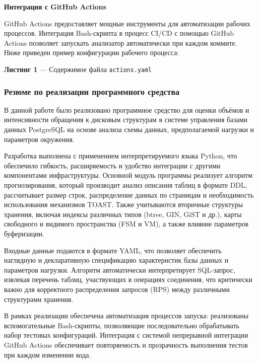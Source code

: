 \textbf{Интеграция с GitHub Actions}

GitHub Actions предоставляет мощные инструменты для автоматизации рабочих процессов. Интеграция Bash-скрипта в процесс CI/CD с помощью GitHub Actions позволяет запускать анализатор автоматически при каждом коммите. Ниже приведен пример конфигурации рабочего процесса:

\begin{center}
\textbf{Листинг 1} --- Содержимое файла \texttt{actions.yaml}
\end{center}




\subsubsection{Резюме по реализации программного средства}

В данной работе было реализовано программное средство для оценки объёмов и интенсивности обращения к дисковым структурам в системе управления базами данных PostgreSQL на основе анализа схемы данных, предполагаемой нагрузки и параметров окружения.

Разработка выполнена с применением интерпретируемого языка Python, что обеспечило гибкость, расширяемость и удобство интеграции с другими компонентами инфраструктуры. Основной модуль программы реализует алгоритм прогнозирования, который производит анализ описания таблиц в формате DDL, рассчитывает размер строк, распределение данных по страницам и необходимость использования механизмов TOAST. Также учитываются вторичные структуры хранения, включая индексы различных типов (btree, GIN, GiST и др.), карты свободного и видимого пространства (FSM и VM), а также влияние параметров буферизации.

Входные данные подаются в формате YAML, что позволяет обеспечить наглядную и декларативную спецификацию характеристик базы данных и параметров нагрузки. Алгоритм автоматически интерпретирует SQL-запрос, извлекая перечень таблиц, участвующих в операциях соединения, что критически важно для корректного распределения запросов (RPS) между различными структурами хранения.

В рамках реализации обеспечена автоматизация процессов запуска: реализованы вспомогательные Bash-скрипты, позволяющие последовательно обрабатывать набор тестовых конфигураций. Интеграция с системой непрерывной интеграции GitHub Actions обеспечивает повторяемость и прозрачность выполнения тестов при каждом изменении кода.

